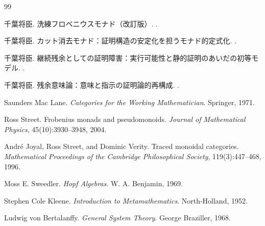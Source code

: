\documentclass[11pt,a4paper]{article}
\theoremstyle{definition}
\begin{document}
\begin{thebibliography}{99}

千葉将臣.
\newblock 洗練フロベニウスモナド（改訂版）.
.

千葉将臣.
\newblock カット消去モナド：証明構造の安定化を担うモナド的定式化.
.

千葉将臣.
\newblock 継続残余としての証明障害：実行可能性と静的証明のあいだの初等モデル.
.

千葉将臣.
\newblock 残余意味論：意味と指示の証明論的再構成.
.

Saunders Mac Lane.
\newblock \emph{Categories for the Working Mathematician}.
\newblock Springer, 1971.

Ross Street.
\newblock Frobenius monads and pseudomonoids.
\newblock \emph{Journal of Mathematical Physics}, 45(10):3930--3948, 2004.

Andr\'e Joyal, Ross Street, and Dominic Verity.
\newblock Traced monoidal categories.
\newblock \emph{Mathematical Proceedings of the Cambridge Philosophical Society}, 119(3):447--468, 1996.

Moss E. Sweedler.
\newblock \emph{Hopf Algebras}.
\newblock W. A. Benjamin, 1969.

Stephen Cole Kleene.
\newblock \emph{Introduction to Metamathematics}.
\newblock North-Holland, 1952.

Ludwig von Bertalanffy.
\newblock \emph{General System Theory}.
\newblock George Braziller, 1968.

\end{thebibliography}
\end{document}
